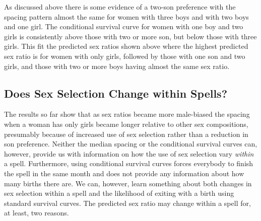 \documentclass[12pt,letterpaper]{article}
\begin{document}
As discussed above there is some evidence of a two-son preference with
the spacing pattern almost the same for women with three boys and with
two boys and one girl.
The conditional survival curve for women with one boy and two girls is
consistently above those with two or more son, but below those with
three girls.
This fit the predicted sex ratios shown above where the highest
predicted sex ratio is for women with only girls, followed by those
with one son and two girls, and those with two or more boys having
almost the same sex ratio.



\subsection{Does Sex Selection Change within Spells?}

The results so far show that as sex ratios became more
male-biased the spacing when a woman has only girls became 
longer relative to other sex compositions, presumably because
of increased use of sex selection rather than a reduction in son preference.
Neither the median spacing or the conditional survival curves
can, however, provide us with information on how the use of
sex selection vary \emph{within} a spell.
Furthermore, using conditional survival curves forces everybody 
to finish the spell in the same month and does not provide
any information about how many births there are.
We can, however, learn something about both changes in 
sex selection within a spell and the likelihood of exiting
with a birth using standard  survival curves.
The predicted sex ratio may change within a spell for, at
least, two reasons.
\end{document}
